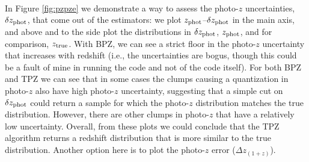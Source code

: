 \documentclass[DM,lsstdraft,toc]{lsstdoc}
\begin{document}
\smallskip {} \\
In Figure \ref{fig:pzpze} we demonstrate a way to assess the photo-$z$ uncertainties, $\delta z_{\rm phot}$, that come out of the estimators: we plot $z_{\rm phot}$--$\delta z_{\rm phot}$ in the main axis, and above and to the side plot the distributions in $\delta z_{\rm phot}$, $z_{\rm phot}$, and for comparison, $z_{\rm true}$. With BPZ, we can see a strict floor in the photo-$z$ uncertainty that increases with redshift (i.e., the uncertainties are bogus, though this could be a fault of mine in running the code and not of the code itself). For both BPZ and TPZ we can see that in some cases the clumps causing a quantization in photo-$z$ also have high photo-$z$ uncertainty, suggesting that a simple cut on $\delta z_{\rm phot}$ could return a sample for which the photo-$z$ distribution matches the true distribution. However, there are other clumps in photo-$z$ that have a relatively low uncertainty. Overall, from these plots we could conclude that the TPZ algorithm returns a redshift distribution that is more similar to the true distribution. Another option here is to plot the photo-$z$ error ($\Delta z_{(1+z)}$).
\end{document}
